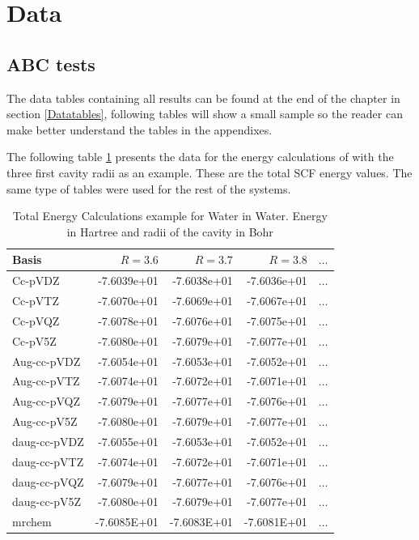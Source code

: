 \documentclass[../master_thesis.tex]{subfiles}
\begin{document}
\section{Data}
\subsection{\ac{ABC} tests}
The data tables containing all results can be found at the end of the chapter in section \ref{Datatables}, following
tables will show a small sample so the reader can make better understand the tables
in the appendixes.

The following table \ref{tab:rawwaterdata}  presents the data for the energy
calculations of  with the three first cavity radii as an example.
These are the total \ac{SCF} energy values.
The same type of tables were used for the rest of the
systems.
\begin{table}[htbp]
\caption{Total Energy Calculations example for Water in Water. Energy in Hartree and radii of the cavity in Bohr}
\begin{center}
\begin{tabular}{|l|r|r|r|r|}
\hline
Basis & $R =3.6$ & $R=3.7$ & $R=3.8$ & $\ldots$\\  \hline
Cc-pVDZ & -7.6039e+01 & -7.6038e+01 & -7.6036e+01 & $\ldots$\\ \hline
Cc-pVTZ & -7.6070e+01 & -7.6069e+01 & -7.6067e+01 & $\ldots$\\ \hline
Cc-pVQZ & -7.6078e+01 & -7.6076e+01 & -7.6075e+01 & $\ldots$\\ \hline
Cc-pV5Z & -7.6080e+01 & -7.6079e+01 & -7.6077e+01 & $\ldots$\\ \hline
Aug-cc-pVDZ & -7.6054e+01 & -7.6053e+01 & -7.6052e+01 & $\ldots$\\ \hline
Aug-cc-pVTZ & -7.6074e+01 & -7.6072e+01 & -7.6071e+01 & $\ldots$\\ \hline
Aug-cc-pVQZ & -7.6079e+01 & -7.6077e+01 & -7.6076e+01 & $\ldots$\\ \hline
Aug-cc-pV5Z & -7.6080e+01 & -7.6079e+01 & -7.6077e+01 & $\ldots$\\ \hline
daug-cc-pVDZ & -7.6055e+01 & -7.6053e+01 & -7.6052e+01 & $\ldots$\\ \hline
daug-cc-pVTZ & -7.6074e+01 & -7.6072e+01 & -7.6071e+01 & $\ldots$\\ \hline
daug-cc-pVQZ & -7.6079e+01 & -7.6077e+01 & -7.6076e+01 & $\ldots$\\ \hline
daug-cc-pV5Z & -7.6080e+01 & -7.6079e+01 & -7.6077e+01 & $\ldots$\\ \hline
mrchem & -7.6085E+01 & -7.6083E+01 & -7.6081E+01 & $\ldots$\\ \hline
\end{tabular}
\end{center}
\label{tab:rawwaterdata}
\end{table}
\end{document}
